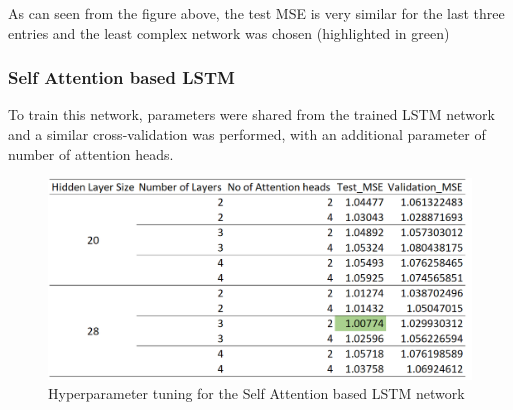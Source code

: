 \documentclass{article}
\begin{document}
As can seen from the figure above, the test MSE is very similar for the last three entries and the least complex network was chosen (highlighted in green)
\subsubsection{Self Attention based LSTM}
To train this network, parameters were shared from the trained LSTM network and a similar cross-validation was performed, with an additional parameter of number of attention heads.
\begin{figure}[H]
\centering
\includegraphics[scale=0.5]{result/res2.png}
\caption{Hyperparameter tuning for the Self Attention based LSTM network}
\end{figure}
\end{document}
